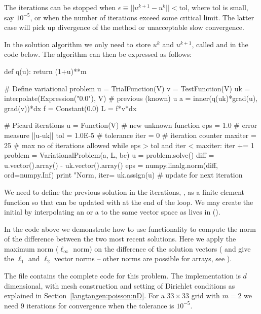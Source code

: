 The iterations can be stopped when $\epsilon\equiv ||u^{k+1}-u^k||
< \mbox{tol}$, where $\mbox{tol}$ is small, say $10^{-5}$, or
when the number of iterations exceed some critical limit. The latter
case will pick up divergence of the method or unacceptable slow
convergence.

In the solution algorithm we only need to store $u^k$ and $u^{k+1}$,
called  and  in the code below.
The algorithm can then be expressed as follows:
\begin{python}
def q(u):
    return (1+u)**m

# Define variational problem
u = TrialFunction(V)
v = TestFunction(V)
uk = interpolate(Expression("0.0"), V)  # previous (known) u
a = inner(q(uk)*grad(u), grad(v))*dx
f = Constant(0.0)
L = f*v*dx

# Picard iterations
u = Function(V)     # new unknown function
eps = 1.0           # error measure ||u-uk||
tol = 1.0E-5        # tolerance
iter = 0            # iteration counter
maxiter = 25        # max no of iterations allowed
while eps > tol and iter < maxiter:
    iter += 1
    problem = VariationalProblem(a, L, bc)
    u = problem.solve()
    diff = u.vector().array() - uk.vector().array()
    eps = numpy.linalg.norm(diff, ord=numpy.Inf)
    print "Norm, iter=%
    uk.assign(u)    # update for next iteration
\end{python}
We need to define the previous solution in the iterations,
, as a finite element function so
that  can be updated with
 at the end of the loop. We may
create the initial 
 by interpolating an
 or a
 to the same vector space as
 lives in
().

In the code above we demonstrate how to use
 functionality to compute the
norm of the difference between the two most recent solutions. Here we
apply the maximum norm ($\ell_\infty$ norm) on the difference of the
solution vectors ( and
 give the $\ell_1$ and $\ell_2$
vector norms -- other norms are possible for
 arrays, see
).

The file  contains
the complete code for this problem. The implementation is $d$
dimensional, with mesh construction and setting of Dirichlet
conditions as explained in Section~\ref{langtangen:poisson:nD}.  For a
$33\times 33$ grid with $m=2$ we need 9 iterations for convergence
when the tolerance is $10^{-5}$.

